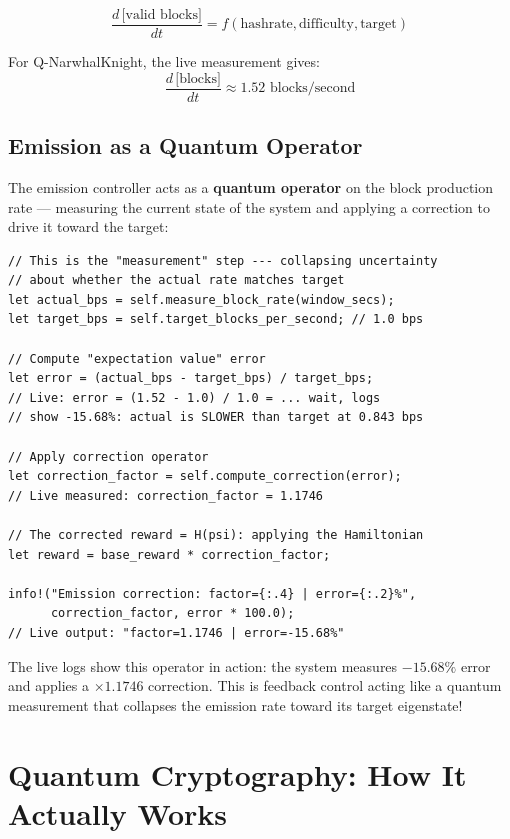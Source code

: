\documentclass[11pt,a4paper]{article}
\begin{document}
\begin{equation}
\frac{d\,\text{[valid blocks]}}{dt} = f(\text{hashrate}, \text{difficulty}, \text{target})
\end{equation}

For Q-NarwhalKnight, the live measurement gives:
\begin{equation}
\frac{d\,\text{[blocks]}}{dt} \approx 1.52 \text{ blocks/second}
\end{equation}

\subsection{Emission as a Quantum Operator}

The emission controller acts as a \textbf{quantum operator} on the block production rate --- measuring the current state of the system and applying a correction to drive it toward the target:

\begin{lstlisting}[caption={The emission controller as a quantum measurement operator (emission\_controller.rs)}]
// This is the "measurement" step --- collapsing uncertainty
// about whether the actual rate matches target
let actual_bps = self.measure_block_rate(window_secs);
let target_bps = self.target_blocks_per_second; // 1.0 bps

// Compute "expectation value" error
let error = (actual_bps - target_bps) / target_bps;
// Live: error = (1.52 - 1.0) / 1.0 = ... wait, logs
// show -15.68%: actual is SLOWER than target at 0.843 bps

// Apply correction operator
let correction_factor = self.compute_correction(error);
// Live measured: correction_factor = 1.1746

// The corrected reward = H(psi): applying the Hamiltonian
let reward = base_reward * correction_factor;

info!("Emission correction: factor={:.4} | error={:.2}%",
      correction_factor, error * 100.0);
// Live output: "factor=1.1746 | error=-15.68%"
\end{lstlisting}

The live logs show this operator in action: the system measures $-15.68\%$ error and applies a $\times 1.1746$ correction. This is feedback control acting like a quantum measurement that collapses the emission rate toward its target eigenstate!

\section{Quantum Cryptography: How It Actually Works}
\end{document}
